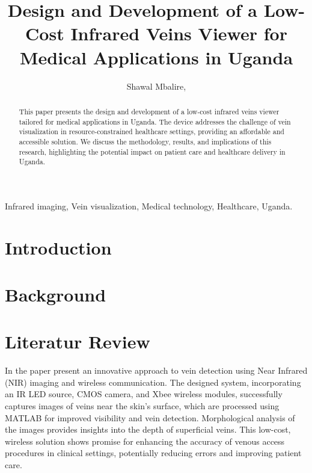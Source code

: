 \documentclass{IEEEtran}
\title{Design and Development of a Low-Cost Infrared Veins Viewer for Medical Applications in Uganda}
\author{
    Shawal Mbalire,
}
\begin{document}
\maketitle

\begin{abstract}
This paper presents the design and development of a low-cost infrared veins viewer tailored for medical applications in Uganda. The device addresses the challenge of vein visualization in resource-constrained healthcare settings, providing an affordable and accessible solution. We discuss the methodology, results, and implications of this research, highlighting the potential impact on patient care and healthcare delivery in Uganda.
\end{abstract}

\begin{IEEEkeywords}
Infrared imaging, Vein visualization, Medical technology, Healthcare, Uganda.
\end{IEEEkeywords}

\section{Introduction}

\section{Background}

\section{Literatur Review}

In the paper \cite{marathe2014novel} present an innovative approach to vein detection using Near Infrared (NIR) imaging and wireless communication. The designed system, incorporating an IR LED source, CMOS camera, and Xbee wireless modules, successfully captures images of veins near the skin's surface, which are processed using MATLAB for improved visibility and vein detection. Morphological analysis of the images provides insights into the depth of superficial veins. This low-cost, wireless solution shows promise for enhancing the accuracy of venous access procedures in clinical settings, potentially reducing errors and improving patient care.
\end{document}

